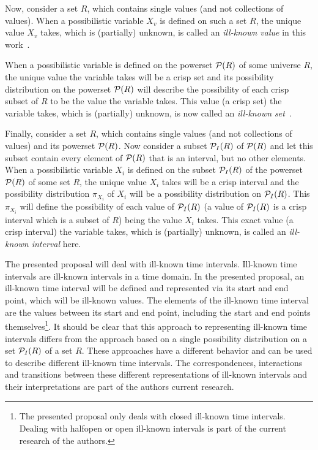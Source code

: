 Now, consider a set $R$, which contains single values (and not collections of values). When a possibilistic variable $X_{v}$ is defined on such a set $R$, the unique value $X_{v}$ takes, which is (partially) unknown, is called an \emph{ill-known value} in this work~\cite{Dubois88b}.

When a possibilistic variable is defined on the powerset $\mathcal{P}(R)$ of some universe $R$, the unique value the variable takes will be a crisp set and its possibility distribution on the powerset $\mathcal{P}(R)$ will describe the possibility of each crisp subset of $R$ to be the value the variable takes. This value (a crisp set) the variable takes, which is (partially) unknown, is now called an \emph{ill-known set}~\cite{Dubois88b}.

Finally, consider a set $R$, which contains single values (and not collections of values) and its powerset $\mathcal{P}(R)$. Now consider a subset $\mathcal{P}_{I}(R)$ of $\mathcal{P}(R)$ and let this subset contain every element of $\mathcal{P}(R)$ that is an interval, but no other elements. When a possibilistic variable $X_{i}$ is defined on the subset $\mathcal{P}_{I}(R)$ of the powerset $\mathcal{P}(R)$ of some set $R$, the unique value $X_{i}$ takes will be a crisp interval and the possibility distribution $\pi_{X_{i}}$ of $X_{i}$ will be a possibility distribution on $\mathcal{P}_{I}(R)$. This $\pi_{X_{i}}$ will define the possibility of each value of $\mathcal{P}_{I}(R)$ (a value of $\mathcal{P}_{I}(R)$ is a crisp interval which is a subset of $R$) being the value $X_{i}$ takes. This exact value (a crisp interval) the variable takes, which is (partially) unknown, is called an \emph{ill-known interval} here.

The presented proposal will deal with ill-known time intervals. Ill-known time intervals are ill-known intervals in a time domain. In the presented proposal, an ill-known time interval will be defined and represented via its start and end point, which will be ill-known values. The elements of the ill-known time interval are the values between its start and end point, including the start and end points themselves\footnote{The presented proposal only deals with closed ill-known time intervals. Dealing with halfopen or open ill-known intervals is part of the current research of the authors.}. It should be clear that this approach to representing ill-known time intervals differs from the approach based on a single possibility distribution on a set $\mathcal{P}_{I}(R)$ of a set $R$. These approaches have a different behavior and can be used to describe different ill-known time intervals. The correspondences, interactions and transitions between these different representations of ill-known intervals and their interpretations are part of the authors current research.

